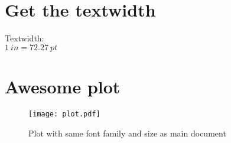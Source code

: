 \documentclass{scrartcl}
\begin{document}
  \section{Get the textwidth}
  Textwidth: \the\textwidth \\
  $\SI{1}{in} = \SI{72.27}{pt}$ 

  \section{Awesome plot}
  
  \blindtext

  \begin{figure}[htbp]
    \centering
    \texttt{[image: plot.pdf]}
    \caption{%
      Plot with same font family and size as main document
    }\label{fig:plot}
  \end{figure}

  \blindtext
\end{document}
